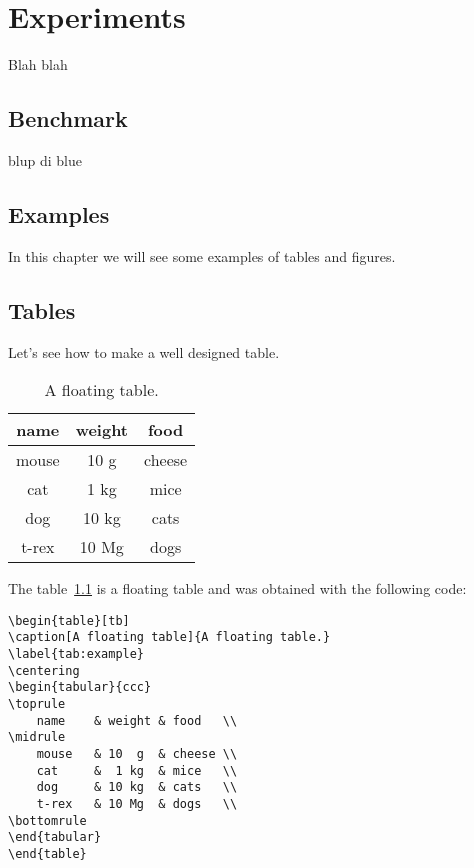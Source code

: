 \chapter{Experiments}

Blah blah

\section{Benchmark}

blup di blue

\section{Examples}

In this chapter we will see some examples of tables and figures.

\section{Tables}
Let's see how to make a well designed table.

\begin{table}[tb]
\caption[A floating table]{A floating table.}
\label{tab:esempio}
\centering
\begin{tabular}{ccc}
\toprule
name & weight & food \\ 
\midrule
mouse	& 10 g	& cheese \\
cat	& 1 kg	& mice \\
dog	& 10 kg	& cats \\
t-rex	& 10 Mg	& dogs \\
\bottomrule 
\end{tabular}
\end{table}

The table~\ref{tab:esempio} is a floating table and was obtained with the following code:
\begin{lstlisting}
\begin{table}[tb]
\caption[A floating table]{A floating table.}
\label{tab:example}
\centering
\begin{tabular}{ccc}
\toprule
	name 	& weight & food	  \\ 
\midrule
	mouse	& 10  g	 & cheese \\
	cat		&  1 kg	 & mice	  \\
	dog		& 10 kg	 & cats   \\
	t-rex	& 10 Mg	 & dogs	  \\
\bottomrule 
\end{tabular}
\end{table}
\end{lstlisting}

